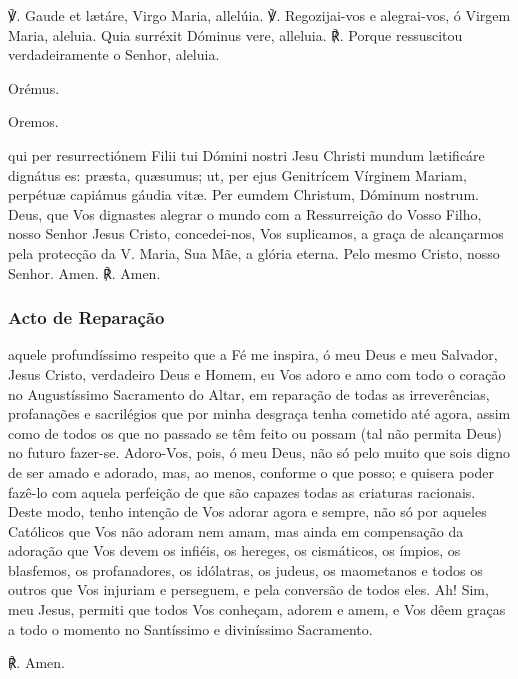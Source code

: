 \begin{nscenter}\emph{}\end{nscenter}

\begin{paracol}{2}
{\redx ℣.} Gaude et lætáre, Virgo Maria, allelúia.
\switchcolumn
{\redx ℣.} Regozijai-vos e alegrai-vos, ó Virgem Maria, aleluia.
 Quia surréxit Dóminus vere, alleluia.
\switchcolumn
{\redx ℟.} Porque ressuscitou verdadeiramente o Senhor, aleluia.
\switchcolumn*
\begin{nscenter} {\redx Orémus.} \end{nscenter}
\switchcolumn
\begin{nscenter} {\redx Oremos.} \end{nscenter}
\switchcolumn*
{} qui per resurrectiónem Filii tui Dómini nostri Jesu Christi mundum lætificáre dignátus es: præsta, quæsumus; ut, per ejus Genitrícem Vírginem Mariam, perpétuæ capiámus gáudia vitæ. Per eumdem Christum, Dóminum nostrum.
\switchcolumn
{} Deus, que Vos dignastes alegrar o mundo com a Ressurreição do Vosso Filho, nosso Senhor Jesus Cristo, concedei-nos, Vos suplicamos, a graça de alcançarmos pela protecção da V. Maria, Sua Mãe, a glória eterna. Pelo mesmo Cristo, nosso Senhor.
 Amen.
\switchcolumn
{\redx ℟.} Amen.
\end{paracol}

\subsubsection{Acto de Reparação}

 aquele profundíssimo respeito que a Fé me inspira, ó meu Deus e meu Salvador, Jesus Cristo, verdadeiro Deus e Homem, eu Vos adoro e amo com todo o coração no Augustíssimo Sacramento do Altar, em reparação de todas as irreverências, profanações e sacrilégios que por minha desgraça tenha cometido até agora, assim como de todos os que no passado se têm feito ou possam (tal não permita Deus) no futuro fazer-se. Adoro-Vos, pois, ó meu Deus, não só pelo muito que sois digno de ser amado e adorado, mas, ao menos, conforme o que posso; e quisera poder fazê-lo com aquela perfeição de que são capazes todas as criaturas racionais. Deste modo, tenho intenção de Vos adorar agora e sempre, não só por aqueles Católicos que Vos não adoram nem amam, mas ainda em compensação da adoração que Vos devem os infiéis, os hereges, os cismáticos, os ímpios, os blasfemos, os profanadores, os idólatras, os judeus, os maometanos e todos os outros que Vos injuriam e perseguem, e pela conversão de todos eles. Ah! Sim, meu Jesus, permiti que todos Vos conheçam, adorem e amem, e Vos dêem graças a todo o momento no Santíssimo e diviníssimo Sacramento. \par
{\redx ℟.} Amen.


